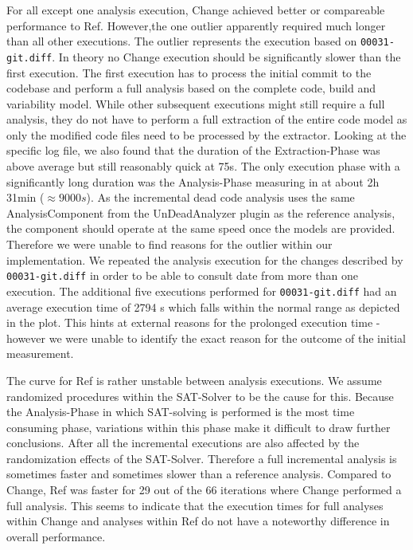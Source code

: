 \documentclass[a4paper]{article}
\begin{document}
For all except one analysis execution, Change achieved better or compareable performance to Ref. However,the one outlier apparently required much longer than all other executions. The outlier represents the execution based on \texttt{00031-git.diff}. In theory no Change execution should be significantly slower than the first execution. The first execution has to process the initial commit to the codebase and perform a full analysis based on the complete code, build and variability model. While other subsequent executions might still require a full analysis, they do not have to perform a full extraction of the entire code model as only the modified code files need to be processed by the extractor. 
Looking at the specific log file, we also found that the duration of the Extraction-Phase was above average but still reasonably quick at 75s. The only execution phase with a significantly long duration was the Analysis-Phase measuring in at about 2h 31min ($\approx 9000s$). As the incremental dead code analysis uses the same AnalysisComponent from the UnDeadAnalyzer plugin as the reference analysis, the component should operate at the same speed once the models are provided. Therefore we were unable to find reasons for the outlier within our implementation. We repeated the analysis execution for the changes described by \texttt{00031-git.diff} in order to be able to consult date from more than one execution. The additional five executions performed for \texttt{00031-git.diff} had an average execution time of 2794 s which falls within the normal range as depicted in the plot. This hints at external reasons for the prolonged execution time - however we were unable to identify the exact reason for the outcome of the initial measurement.

The curve for Ref is rather unstable between analysis executions. We assume randomized procedures within the SAT-Solver to be the cause for this. Because the Analysis-Phase in which SAT-solving is performed is the most time consuming phase, variations within this phase make it difficult to draw further conclusions. After all the incremental executions are also affected by the randomization effects of the SAT-Solver. Therefore a full incremental analysis is sometimes faster and sometimes slower than a reference analysis. Compared to Change, Ref was faster for 29 out of the 66 iterations where Change performed a full analysis. This seems to indicate that the execution times for full analyses within Change and analyses within Ref do not have a noteworthy difference in overall performance.
\end{document}
